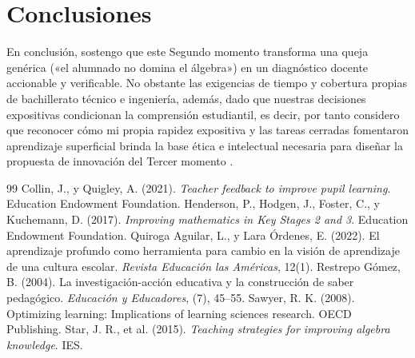 \documentclass[spanish,letterpaper,oneside]{article}
\begin{document}
\clearpage
\section{Conclusiones}
En conclusión, sostengo que este Segundo momento transforma una queja genérica («el alumnado no domina el álgebra») en un diagnóstico docente accionable y verificable. No obstante las exigencias de tiempo y cobertura propias de bachillerato técnico e ingeniería, además, dado que nuestras decisiones expositivas condicionan la comprensión estudiantil, es decir, por tanto considero que reconocer cómo mi propia rapidez expositiva y las tareas cerradas fomentaron aprendizaje superficial brinda la base ética e intelectual necesaria para diseñar la propuesta de innovación del Tercer momento \citep{restrepo2004investigacion,quiroga2022aprendizaje}.

\clearpage
\begin{thebibliography}{99}
 Collin, J., y Quigley, A. (2021). \textit{Teacher feedback to improve pupil learning}. Education Endowment Foundation.
 Henderson, P., Hodgen, J., Foster, C., y Kuchemann, D. (2017). \textit{Improving mathematics in Key Stages 2 and 3}. Education Endowment Foundation.
 Quiroga Aguilar, L., y Lara Órdenes, E. (2022). El aprendizaje profundo como herramienta para cambio en la visión de aprendizaje de una cultura escolar. \textit{Revista Educación las Américas}, 12(1).
 Restrepo Gómez, B. (2004). La investigación-acción educativa y la construcción de saber pedagógico. \textit{Educación y Educadores}, (7), 45--55.
 Sawyer, R. K. (2008). Optimizing learning: Implications of learning sciences research. OECD Publishing.
 Star, J. R., et al. (2015). \textit{Teaching strategies for improving algebra knowledge}. IES.
\end{thebibliography}
\end{document}
